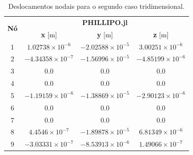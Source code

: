 \begin{table}
    \centering
    \caption{Deslocamentos nodais para o segundo caso tridimensional.}
    \begin{tabular}{c | c c c }
        \toprule
        \multirow{2}{*}{\textbf{Nó}} & \multicolumn{3}{c}{\textbf{PHILLIPO.jl}}  \\
                                     & \textbf{x} [m] & \textbf{y} [m] & \textbf{z} [m]\\                            
        \midrule
        1 & $1.02738 \times 10^{-6}$ & $-2.02588 \times 10^{-5}$ & $3.00251 \times 10^{-6}$ \\
        2 & $-4.34358 \times 10^{-7}$ & $-1.56996 \times 10^{-5}$ & $-4.85199 \times 10^{-6}$ \\
        3 & $0.0$ & $0.0$ & $0.0$ \\
        4 & $0.0$ & $0.0$ & $0.0$ \\
        5 & $-1.19159 \times 10^{-6}$ & $-1.38869 \times 10^{-5}$ & $-2.90123 \times 10^{-6}$ \\
        6 & $0.0$ & $0.0$ & $0.0$ \\
        7 & $0.0$ & $0.0$ & $0.0$ \\
        8 & $4.4546 \times 10^{-7}$ & $-1.89878 \times 10^{-5}$ & $6.81349 \times 10^{-6}$ \\
        9 & $-3.03331 \times 10^{-7}$ & $-8.53913 \times 10^{-6}$ & $1.49066 \times 10^{-7}$ \\
        \bottomrule
    \end{tabular}
    \label{tab:verificacao_cubo_2_deslocamentos}
\end{table}

